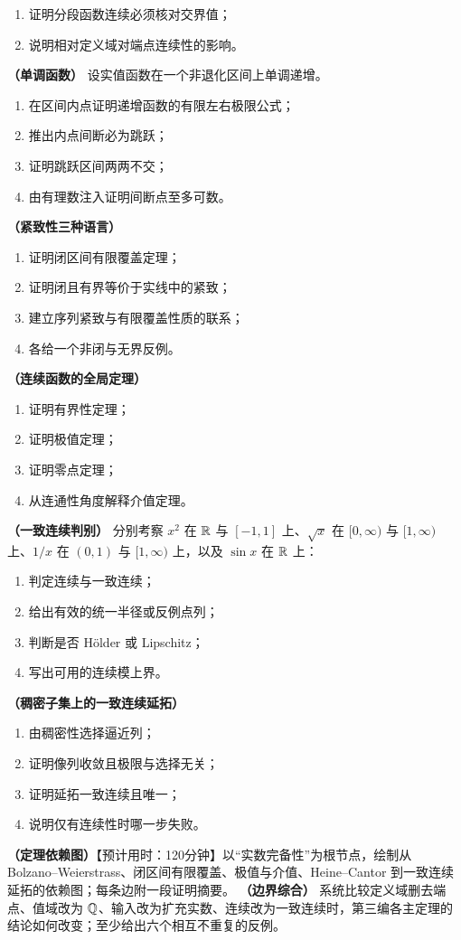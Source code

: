 \begin{enumerate}[label=\textbf{综.\arabic*.}]
\begin{enumerate}
  \item 证明分段函数连续必须核对交界值；
  \item 说明相对定义域对端点连续性的影响。
 \end{enumerate}
  \textbf{（单调函数）} 设实值函数在一个非退化区间上单调递增。
 \begin{enumerate}
  \item 在区间内点证明递增函数的有限左右极限公式；
  \item 推出内点间断必为跳跃；
  \item 证明跳跃区间两两不交；
  \item 由有理数注入证明间断点至多可数。
 \end{enumerate}
  \textbf{（紧致性三种语言）}
 \begin{enumerate}
  \item 证明闭区间有限覆盖定理；
  \item 证明闭且有界等价于实线中的紧致；
  \item 建立序列紧致与有限覆盖性质的联系；
  \item 各给一个非闭与无界反例。
 \end{enumerate}
  \textbf{（连续函数的全局定理）}
 \begin{enumerate}
  \item 证明有界性定理；
  \item 证明极值定理；
  \item 证明零点定理；
  \item 从连通性角度解释介值定理。
 \end{enumerate}
  \textbf{（一致连续判别）} 分别考察 \(x^2\) 在 \(\mathbb{R}\) 与 \([-1,1]\) 上、\(\sqrt x\) 在 \([0,\infty)\) 与 \([1,\infty)\) 上、\(1/x\) 在 \((0,1)\) 与 \([1,\infty)\) 上，以及 \(\sin x\) 在 \(\mathbb{R}\) 上：
 \begin{enumerate}
  \item 判定连续与一致连续；
  \item 给出有效的统一半径或反例点列；
  \item 判断是否 Hölder 或 Lipschitz；
  \item 写出可用的连续模上界。
 \end{enumerate}
  \textbf{（稠密子集上的一致连续延拓）}
 \begin{enumerate}
  \item 由稠密性选择逼近列；
  \item 证明像列收敛且极限与选择无关；
  \item 证明延拓一致连续且唯一；
  \item 说明仅有连续性时哪一步失败。
 \end{enumerate}
  \textbf{（定理依赖图）}【预计用时：120分钟】以“实数完备性”为根节点，绘制从 Bolzano--Weierstrass、闭区间有限覆盖、极值与介值、Heine--Cantor 到一致连续延拓的依赖图；每条边附一段证明摘要。
  \textbf{（边界综合）} 系统比较定义域删去端点、值域改为 \(\mathbb{Q}\)、输入改为扩充实数、连续改为一致连续时，第三编各主定理的结论如何改变；至少给出六个相互不重复的反例。
\end{enumerate}
